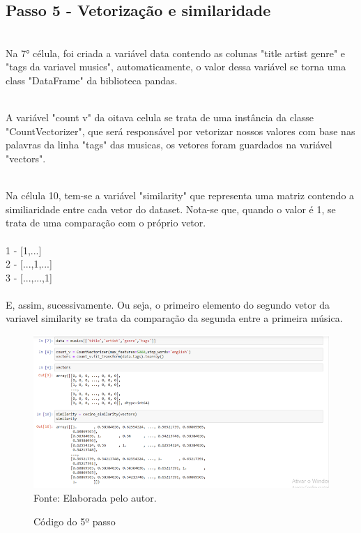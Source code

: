 \documentclass[a4paper, 12pt]{article}
\begin{document}
\newpage
\subsection{Passo 5 - Vetorização e similaridade}

\\Na 7° célula, foi criada a variável data contendo as colunas "title artist genre" e "tags da variavel musics", automaticamente,
o valor dessa variável se torna uma class "DataFrame" da biblioteca pandas.

\\A variável "count v" da oitava celula se trata de uma instância da classe "CountVectorizer", que será responsável por vetorizar nossos
valores com base nas palavras da linha "tags" das musicas, os vetores foram guardados na variável "vectors".

\\Na célula 10, tem-se a variável "similarity" que representa uma matriz contendo a similiaridade entre cada vetor do dataset.
Nota-se que, quando o valor é 1, se trata de uma comparação com o próprio vetor.
\\\\
1 - [1,...]\\
2 - [...,1,...]\\
3 - [...,...,1]
\\

\\E, assim, sucessivamente. Ou seja, o primeiro elemento do segundo vetor da variavel similarity se trata da comparação da segunda entre a primeira música.
 \begin{figure}[!ht]
        \centering
        \caption{Código do 5º passo}
        \includegraphics[scale=0.5]{5passo.png} \\
        {\footnotesize Fonte: Elaborada pelo autor.}
        \label{fig:my_label}
    \end{figure}
\end{document}
